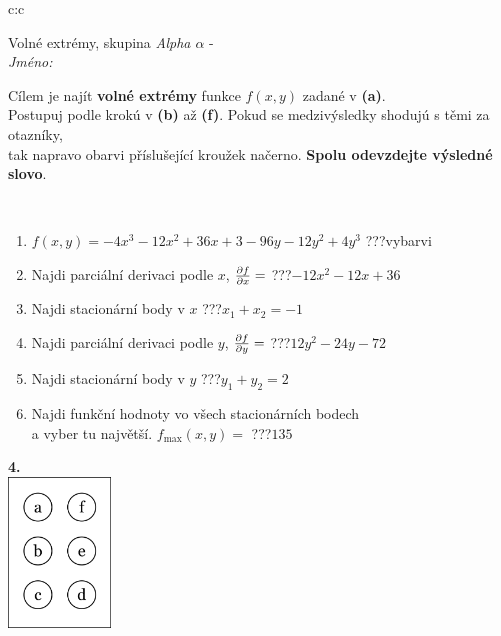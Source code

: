 \documentclass[10pt]{report}
\begin{document}
\begin{tabular}{c:c}
\begin{minipage}[c][104.5mm][t]{0.5\linewidth}
\begin{center}
\vspace{7mm}
{\huge Volné extrémy, skupina \textit{Alpha $\alpha$} -}\\[5mm]
\textit{Jméno:}\phantom{xxxxxxxxxxxxxxxxxxxxxxxxxxxxxxxxxxxxxxxxxxxxxxxxxxxxxxxxxxxxxxxxx}\\[5mm]
\begin{minipage}{0.95\linewidth}
\begin{center}
Cílem je najít \textbf{volné extrémy} funkce $f(x,y)$ zadané v \textbf{(a)}.\\Postupuj podle krokú v \textbf{(b)} až \textbf{(f)}. Pokud se medzivýsledky shodujú s těmi za otazníky,\\tak napravo obarvi příslušející kroužek načerno. \textbf{Spolu odevzdejte výsledné slovo}.
\end{center}
\end{minipage}
\\[1mm]
\begin{minipage}{0.79\linewidth}
\begin{center}
\begin{varwidth}{\linewidth}
\begin{enumerate}
\normalsize
\item $f(x,y)=-4x^3-12x^2+36x+3-96y-12y^2+4y^3$\quad \dotfill\; ???\;\dotfill \quad vybarvi
\item Najdi parciální derivaci podle $x$, $\pdv{f}{x}=$\quad \dotfill\; ???\;\dotfill \quad $-12x^2-12x+36$
\item Najdi stacionární body v $x$\quad \dotfill\; ???\;\dotfill \quad $x_1+x_2=-1$
\item Najdi parciální derivaci podle $y$, $\pdv{f}{y}=$\quad \dotfill\; ???\;\dotfill \quad $12y^2-24y-72$
\item Najdi stacionární body v $y$\quad \dotfill\; ???\;\dotfill \quad $y_1+y_2=2$
\item Najdi funkční hodnoty vo všech stacionárních bodech \\ \phantom{xxxxxx} a vyber tu najvětší. $f_{\text{max}}(x,y)=$\quad \dotfill\; ???\;\dotfill \quad $135$
\end{enumerate}
\end{varwidth}
\end{center}
\end{minipage}
\begin{minipage}{0.20\linewidth}
\begin{center}
{\Huge\bfseries 4.} \\[2mm]
\includegraphics[height=40mm]{../images/braille.png}

\end{center}
\end{minipage}
\end{center}
\end{minipage}
\end{tabular}
\end{document}
